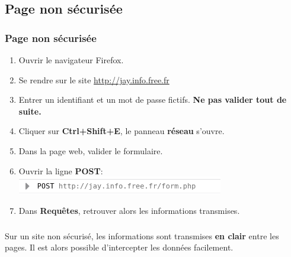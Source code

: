 \documentclass[svgnames,11pt]{beamer}
\begin{document}
\subsection{Page non sécurisée}
\begin{frame}
    \frametitle{Page non sécurisée}

    \begin{activite}
        \begin{enumerate}
            \item Ouvrir le navigateur Firefox.
            \item Se rendre sur le site \url{http://jay.info.free.fr}
            \item Entrer un identifiant et un mot de passe fictifs. \textbf{Ne pas valider tout de suite.}
            \item  Cliquer sur \textbf{Ctrl+Shift+E}, le panneau \textbf{réseau} s'ouvre.
            \item Dans la page web, valider le formulaire.
            \item Ouvrir la ligne \textbf{POST}:
                      \includegraphics[width=9cm]{ressources/post-ff.png}
            \item Dans \textbf{Requêtes}, retrouver alors les informations transmises.
        \end{enumerate}
    \end{activite}

\end{frame}
\begin{frame}
    \frametitle{}

    \begin{aretenir}[]
        Sur un site non sécurisé, les informations sont transmises \textbf{en clair} entre les pages. Il est alors possible d'intercepter les données facilement.
    \end{aretenir}

\end{frame}
\end{document}
